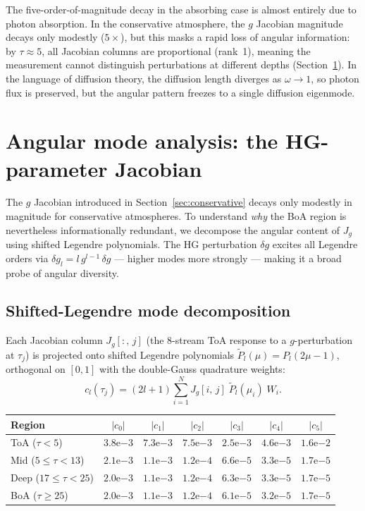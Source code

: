 \documentclass[11pt]{article}
\begin{document}
The five-order-of-magnitude decay in the absorbing case is
almost entirely due to photon absorption.  In the conservative
atmosphere, the $g$ Jacobian magnitude decays only modestly
($5\times$), but this masks a rapid loss of angular information:
by $\tau\approx 5$, all Jacobian columns are proportional
(rank~1), meaning the measurement cannot distinguish perturbations
at different depths (Section~\ref{sec:angular}).
In the language of diffusion theory, the diffusion length
diverges as $\omega\to 1$, so photon flux is preserved, but
the angular pattern freezes to a single diffusion eigenmode.


\section{Angular mode analysis: the HG-parameter Jacobian}
\label{sec:angular}

The $g$ Jacobian introduced in Section~\ref{sec:conservative}
decays only modestly in magnitude for conservative atmospheres.
To understand \emph{why} the BoA region is nevertheless
informationally redundant, we decompose the angular content
of $J_g$ using shifted Legendre polynomials.  The HG perturbation
$\delta g$ excites all Legendre orders via $\delta g_l = l\,g^{l-1}\,\delta g$
--- higher modes more strongly --- making it a broad probe of
angular diversity.

\subsection{Shifted-Legendre mode decomposition}

Each Jacobian column $J_g[:,\,j]$ (the 8-stream ToA response to a
$g$-perturbation at $\tau_j$) is projected onto shifted Legendre
polynomials $\tilde{P}_l(\mu) = P_l(2\mu - 1)$, orthogonal on
$[0,1]$ with the double-Gauss quadrature weights:
\[
  c_l(\tau_j) = (2l+1)\sum_{i=1}^{N}
    J_{g}[i,\,j]\;\tilde{P}_l(\mu_i)\;W_i.
\]

\begin{center}
\begin{tabular}{l c c c c c c}
\toprule
Region & $|c_0|$ & $|c_1|$ & $|c_2|$ & $|c_3|$ & $|c_4|$ & $|c_5|$\\
\midrule
ToA ($\tau<5$)  & $3.8\mathrm{e}{-3}$ & $7.3\mathrm{e}{-3}$
  & $7.5\mathrm{e}{-3}$ & $2.5\mathrm{e}{-3}$ & $4.6\mathrm{e}{-3}$ & $1.6\mathrm{e}{-2}$\\
Mid ($5\!\leq\!\tau\!<\!13$) & $2.1\mathrm{e}{-3}$ & $1.1\mathrm{e}{-3}$
  & $1.2\mathrm{e}{-4}$ & $6.6\mathrm{e}{-5}$ & $3.3\mathrm{e}{-5}$ & $1.7\mathrm{e}{-5}$\\
Deep ($17\!\leq\!\tau\!<\!25$) & $2.0\mathrm{e}{-3}$ & $1.1\mathrm{e}{-3}$
  & $1.2\mathrm{e}{-4}$ & $6.3\mathrm{e}{-5}$ & $3.3\mathrm{e}{-5}$ & $1.7\mathrm{e}{-5}$\\
BoA ($\tau\geq 25$)  & $2.0\mathrm{e}{-3}$ & $1.1\mathrm{e}{-3}$
  & $1.2\mathrm{e}{-4}$ & $6.1\mathrm{e}{-5}$ & $3.2\mathrm{e}{-5}$ & $1.7\mathrm{e}{-5}$\\
\bottomrule
\end{tabular}
\end{center}
\end{document}

